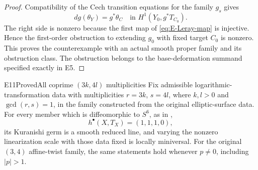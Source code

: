 \begin{proof}
Compatibility of the Cech transition equations for the family
$g_s$ gives
\[
 dg(\theta_Y)=g^*\theta_C
       \quad\text{in }H^1(Y_0,g^*T_{C_0}).
\]
The right side is nonzero because the first map of
\eqref{eq:E-Leray-map} is injective. Hence the first-order
obstruction to extending $g_0$ with fixed target $C_0$ is nonzero.
This proves the counterexample with an actual smooth proper
family and its obstruction class. The obstruction belongs to
the base-deformation summand specified exactly in E5.
\end{proof}

\begin{statement}{E11}{Proved}{All coprime $(3k,4l)$ multiplicities}
Fix admissible logarithmic-transformation data with multiplicities
$r=3k$, $s=4l$, where $k,l>0$ and $\gcd(r,s)=1$, in the family
constructed from the original elliptic-surface data. For every member
which is diffeomorphic to $S^6$, as in
\cite[Theorem labelled \texttt{t:main}]{Viaclovsky2026Log},
\[
 h^\bullet(X,T_X)=(1,1,1,0),
\]
its Kuranishi germ is a smooth reduced line, and varying the nonzero
linearization scale with those data fixed is locally miniversal.
For the original $(3,4)$ affine-twist family, the same statements
hold whenever $p\ne0$, including $|p|>1$.
\end{statement}

